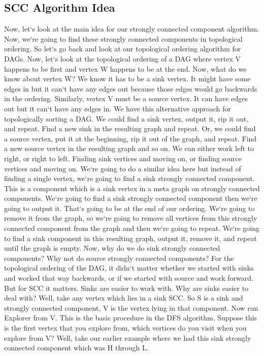 \subsection{SCC Algorithm Idea}
Now, let`s look at the main idea for our strongly connected component algorithm.
Now, we`re going to find these strongly connected components in topological ordering.
So let`s go back and look at our topological ordering algorithm for DAGs.
Now, let`s look at the topological ordering of a DAG where vertex V happens to be first and vertex W happens to be at the end.
Now, what do we know about vertex W? We know it has to be a sink vertex.
It might have some edges in but it can`t have any edges out because those edges would go backwards in the ordering.
Similarly, vertex V must be a source vertex.
It can have edges out but it can`t have any edges in.
We have this alternative approach for topologically sorting a DAG\@.
We could find a sink vertex, output it, rip it out, and repeat.
Find a new sink in the resulting graph and repeat.
Or, we could find a source vertex, put it at the beginning, rip it out of the graph, and repeat.
Find a new source vertex in the resulting graph and so on.
We can either work left to right, or right to left.
Finding sink vertices and moving on, or finding source vertices and moving on.
We`re going to do a similar idea here but instead of finding a single vertex, we`re going to find a sink strongly connected component.
This is a component which is a sink vertex in a meta graph on strongly connected components.
We`re going to find a sink strongly connected component then we`re going to output it.
That`s going to be at the end of our ordering.
We`re going to remove it from the graph, so we`re going to remove all vertices from this strongly connected component from the graph and then we`re going to repeat.
We`re going to find a sink component in this resulting graph, output it, remove it, and repeat until the graph is empty.
Now, why do we do sink strongly connected components? Why not do source strongly connected components? For the topological ordering of the DAG, it didn`t matter whether we started with sinks and worked that way backwards, or if we started with source and work forward.
But for SCC it matters.
Sinks are easier to work with.
Why are sinks easier to deal with? Well, take any vertex which lies in a sink SCC\@.
So S is a sink and strongly connected component, V is the vertex lying in that component.
Now run Explorer from V\@.
This is the basic procedure in the DFS algorithm.
Suppose this is the first vertex that you explore from, which vertices do you visit when you explore from V? Well, take our earlier example where we had this sink strongly connected component which was H through L\@.
